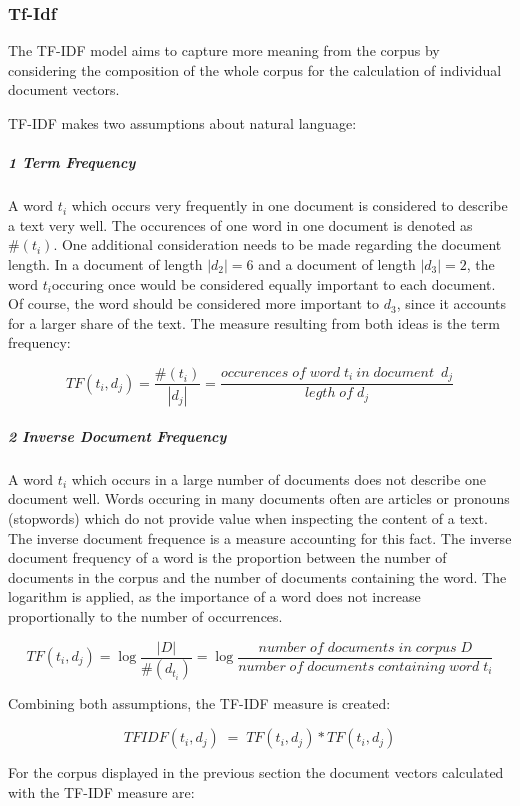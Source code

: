 		\subsubsection{Tf-Idf}
		The \ac{TF-IDF} model aims to capture more meaning from the corpus by considering the composition of the whole corpus for the calculation of individual document vectors.
		
		\ac{TF-IDF} makes two assumptions about natural language:
		
		\subparagraph{1 Term Frequency}
		
		A word $t_{i} $ which occurs very frequently in one document is considered to describe a text very well. The occurences of one word in one document is denoted as $ \#( t_{i}) $.
		One additional consideration needs to be made regarding the document length. In a document of length $ |d_{2}| = 6 $ and a document of length  $ |d_{3}| = 2 $, the word $ t_{i} $occuring once would be considered equally important to each document. Of course, the word should be considered more important to $ d_{3} $, since it accounts for a larger share of the text. The measure resulting from both ideas is the term frequency:
		
		\[ TF(t_{i}, d_{j}) =   \dfrac{\#( t_{i})}{|d_{j}|} = \dfrac{occurences \; of \; word \; t_{i} \: in \; document \;\:   d_{j}}{legth \; of \; d_{j}} \]
		
		\subparagraph{2 Inverse Document Frequency}
		A word $t_{i} $ which occurs in a large number of documents does not describe one document well. Words occuring in many documents often are articles or pronouns (stopwords) which do not provide value when inspecting the content of a text. The inverse document frequence is a measure accounting for this fact. The inverse document frequency of a word is the proportion between the number of documents in the corpus and the number of documents containing the word. The logarithm is applied, as the importance of a word does not increase proportionally to the number of occurrences.
	
		
		\[ TF(t_{i}, d_{j}) = \log \dfrac{|D|}{\#(d_{t_{i}}) } =  \log \dfrac{number \;  of\;  documents \;  in \; corpus \; D}{ number \; of \; documents \; containing \; word \; t_{i}} \]
		
		Combining both assumptions, the \ac{TF-IDF} measure is created:
		
		\[ TFIDF(t_{i}, d_{j}) \;=\; TF(t_{i}, d_{j}) * TF(t_{i}, d_{j})\]
		
		For the corpus displayed in the previous section the document vectors calculated with the \ac{TF-IDF} measure are:
		
